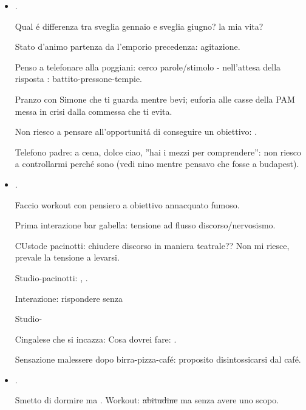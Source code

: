 \begin{itemize}
stato d'animo insicuro mentre vado a vecchiano.

: tutto il giorno mi affligge debolezza, sonnolenza, attacchi di panico

\item {}.

Qual \'e differenza tra sveglia gennaio e sveglia giugno? la mia vita?

Stato d'animo partenza da l'emporio precedenza: agitazione.

Penso a telefonare alla poggiani: cerco parole/stimolo - nell'attesa della risposta : battito-pressone-tempie.

Pranzo  con Simone che ti guarda mentre bevi; euforia alle casse della PAM messa in crisi dalla commessa che ti evita.

Non riesco a pensare all'opportunit\'a di conseguire un obiettivo: .

Telefono padre: a cena, dolce ciao, ''hai i mezzi per comprendere'': non riesco a controllarmi perch\'e sono  (vedi nino mentre pensavo che fosse a budapest).


\item {}.

Faccio workout con pensiero a obiettivo annacquato fumoso.

Prima interazione bar gabella: tensione ad  flusso discorso/nervosismo.

CUstode pacinotti: chiudere discorso in maniera teatrale?? Non mi riesce, prevale la tensione a levarsi. 

Studio-pacinotti: , .

Interazione: rispondere senza 

Studio-

Cingalese che si incazza: Cosa dovrei fare: .

Sensazione malessere dopo birra-pizza-caf\'e: proposito disintossicarsi dal caf\'e.

\item {}.

Smetto di dormire ma . Workout: \sout{abitudine} ma senza avere uno scopo.


\end{itemize}
